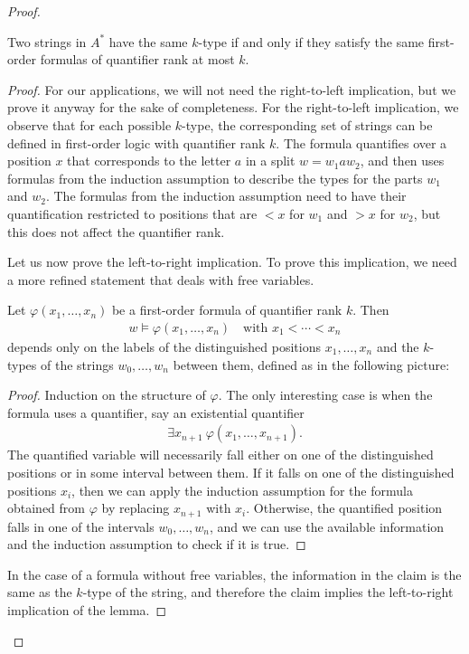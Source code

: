 \begin{proof}
\begin{lemma}\label{lem:k-types-fo-equivalence}
    Two strings in $A^*$ have the same $k$-type if and only if they satisfy the same first-order formulas of quantifier rank at most $k$.
\end{lemma}
\begin{proof}
    For our applications, we will not need the right-to-left implication, but we prove it anyway for the sake of completeness.
    For the right-to-left implication, we observe that for each possible $k$-type, the corresponding set of strings can be defined in first-order logic with quantifier rank $k$. The formula quantifies over a position $x$ that  corresponds to the letter $a$ in a split $ w = w_1 a w_2$, and  then uses formulas from the induction assumption to describe the types for the parts $w_1$ and $w_2$. The formulas from the induction assumption need to have their quantification restricted to positions that are $<x$ for $w_1$ and $>x$ for $w_2$, but this does not affect the quantifier rank. 

    Let us now prove the left-to-right implication. To prove this implication, we need a more refined statement that deals with free variables.
    \begin{claim}\label{claim:fo-composition-quantifier-rank}
        Let $\varphi(x_1,\ldots,x_n)$ be a first-order formula of quantifier rank  $k$. Then 
        \begin{align*}
        w \models \varphi(x_1,\ldots,x_n) \quad \text{with }x_1 < \cdots < x_n
        \end{align*}
     depends only on the labels of the distinguished positions $x_1,\ldots,x_n$ and the $k$-types of the strings
     $w_0,\ldots,w_n$ between them, defined as in the following picture:
    \end{claim}
    \begin{proof} Induction on the structure of $\varphi$. The only interesting case is when the formula uses a quantifier, say an existential quantifier
        \begin{align*}
        \exists x_{n+1} \ \varphi(x_1,\ldots,x_{n+1}).
        \end{align*}
        The quantified variable will necessarily fall either on one of the distinguished positions  or in some interval between them. If it falls on one of the distinguished positions $x_i$, then we can apply the induction assumption for the formula obtained from $\varphi$ by replacing $x_{n+1}$ with $x_i$. Otherwise, the quantified position falls in one of the intervals $w_0,\ldots,w_n$, and we can use the available information and the induction assumption to check if it is true.
    \end{proof}
    In the case of a formula without free variables, the information in the claim is the same as the $k$-type of the string, and therefore the claim implies the left-to-right implication of the lemma.
\end{proof}


\end{proof}
